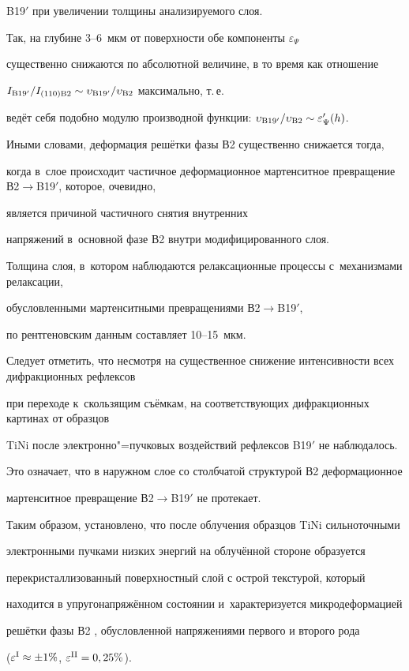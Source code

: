 B19$'$ при увеличении толщины анализируемого слоя.

Так, на глубине 3--6~мкм от поверхности обе компоненты $\varepsilon _{\Psi }$

существенно снижаются по абсолютной величине, в то время как отношение

$I_{\rm B19'}/I_{\rm (110)B2} \sim \upsilon _{\rm B19'}/\upsilon _{\rm B2}$ максимально, т.\,е.

ведёт себя подобно модулю производной функции: $\upsilon _{\rm B19'}/\upsilon _{\rm B2} \sim \varepsilon_\Psi'(h)$.

Иными словами, деформация решётки фазы В2 существенно снижается тогда,

когда в~слое происходит частичное деформационное мартенситное превращение В2$\to$B19$'$, которое, очевидно,

является причиной частичного снятия внутренних

напряжений в~основной фазе В2 внутри модифицированного слоя.

Толщина слоя, в~котором наблюдаются релаксационные процессы с~механизмами релаксации,

обусловленными мартенситными превращениями В2$\to $B19$'$,

по рентгеновским данным составляет 10--15~мкм.

Следует отметить, что несмотря на существенное снижение интенсивности всех дифракционных рефлексов

при переходе к~скользящим съёмкам, на соответствующих дифракционных картинах от образцов

TiNi после электронно"=пучковых воздействий рефлексов B19$'$ не наблюдалось.

Это означает, что в наружном слое со столбчатой структурой В2  деформационное

мартенситное превращение В2$\to $B19$'$ не протекает.



Таким образом, установлено, что после облучения образцов TiNi сильноточными

электронными пучками низких энергий на облучённой стороне образуется

перекристаллизованный поверхностный слой с острой текстурой, который

находится в упругонапряжённом состоянии и~характеризуется микродеформацией

решётки фазы В2 , обусловленной напряжениями первого и второго рода

($\varepsilon^{\rm I}\approx \pm 1{\%}$, $\varepsilon ^{\rm II}=0,25{\%}$).

